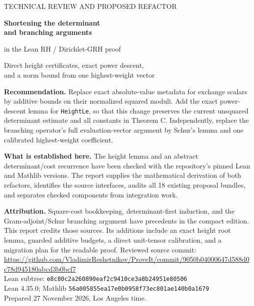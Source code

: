 \documentclass[11pt,a4paper]{article}
\numberwithin{equation}{section}
\theoremstyle{definition}
\theoremstyle{remark}
\newcommand{\code}[1]{{\small\nolinkurl{#1}}}
\begin{document}
\begin{titlepage}
\color{ink}
{\large TECHNICAL REVIEW AND PROPOSED REFACTOR\par}
\vspace{12mm}
{\huge\bfseries Shortening the determinant\\[3pt]
and branching arguments\par}
\vspace{5mm}
{\Large in the Lean RH / Dirichlet-GRH proof\par}
\vspace{9mm}
{\large Direct height certificates, exact power descent,\\
and a norm bound from one highest-weight vector\par}
\vspace{10mm}
\color{black}
\textbf{Recommendation.}
Replace exact absolute-value metadata for exchange scalars by additive bounds
on their normalized squared moduli. Add the exact power-descent lemma for
\code{HeightLe}, so that this change preserves the current unsquared determinant
estimate and all constants in Theorem C. Independently, replace the branching
operator's full evaluation-vector argument by Schur's lemma and one calibrated
highest-weight coefficient.

\textbf{What is established here.}
The height lemma and an abstract determinant/cost recurrence have been checked
with the repository's pinned Lean and Mathlib versions. The report supplies the
mathematical derivation of both refactors, identifies the source interfaces,
audits all 18 existing proposal bundles, and separates checked components from
integration work.

\textbf{Attribution.}
Square-cost bookkeeping, determinant-first induction, and the
Gram-adjoint/Schur branching argument have precedents in the compact edition.
This report credits those sources. Its additions include an exact height
root lemma, guarded additive budgets, a direct unit-tensor calibration,
and a migration plan for the readable proof.
\vfill
\small
Reviewed source commit:
\url{https://github.com/VladimirReshetnikov/ProveIt/commit/9050b04000647d588d0c78d945180abcd3b0bcf7}\\
Lean subtree: \code{e8c80c2a260890eaf2c9410ce3a8b24951e80506}\\
Lean 4.35.0; Mathlib \code{56a005855ea17e0b0958f73ec801ae140b0a1679}\\
Prepared 27 November 2026, Los Angeles time.
\end{titlepage}
\begingroup
\small
\setlength{\parskip}{0pt}
\tableofcontents
\endgroup
\newpage





\end{document}
